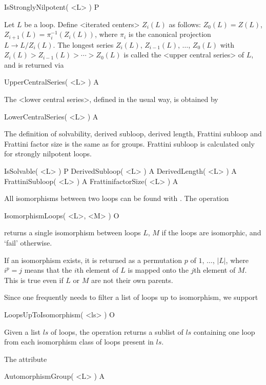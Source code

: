 \>IsStronglyNilpotent( <L> ) P

Let $L$ be a loop. Define <iterated centers> $Z_i(L)$
as follows: $Z_0(L)=Z(L)$, $Z_{i+1}(L) = \pi_i^{-1}( Z_i(L) )$, where $\pi_i$
is the canonical projection $L\to L/Z_i(L)$. The longest series $Z_i(L)$,
$Z_{i-1}(L)$, $\dots$, $Z_0(L)$ with $Z_i(L)>Z_{i-1}(L)>\cdots >Z_0(L)$ is
called the <upper central series> of $L$, and is
returned via

\>UpperCentralSeries( <L> ) A

The <lower central series>, defined in the usual
way, is obtained by

\>LowerCentralSeries( <L> ) A


The definition of solvability, derived subloop, derived length, Frattini
subloop and Frattini factor size is the same as for groups. Frattini subloop is
calculated only for strongly nilpotent loops.

\>IsSolvable( <L> ) P
\>DerivedSubloop( <L> ) A
\>DerivedLength( <L> ) A
\>FrattiniSubloop( <L> ) A
\>FrattinifactorSize( <L> ) A


All isomorphisms between two loops can be found with {\LOOPS}. The operation

\>IsomorphismLoops( <L>, <M> ) O

returns a single isomorphism between loops $L$, $M$ if the loops are
isomorphic, and `fail' otherwise.

If an isomorphism exists, it is returned as a permutation $p$ of $1$, $\dots$,
$|L|$, where $i^p=j$ means that the $i$th element of $L$ is mapped onto the
$j$th element of $M$. This is true even if $L$ or $M$ are not their own
parents.

Since one frequently needs to filter a list of loops up to isomorphism, we
support

\>LoopsUpToIsomorphism( <ls> ) O

Given a list $ls$ of loops, the operation returns a sublist of $ls$ containing
one loop from each isomorphism class of loops present in $ls$.

The attribute

\>AutomorphismGroup( <L> ) A

